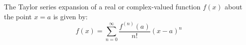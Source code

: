 \documentclass{article}
\begin{document}
The Taylor series expansion of a real or complex-valued function $f(x)$ about the point $x=a$ is given by:
\begin{equation}
f(x) = \sum_{n=0}^{\infty} \frac{f^{(n)}(a)}{n!} (x-a)^n
\end{equation}
\end{document}
